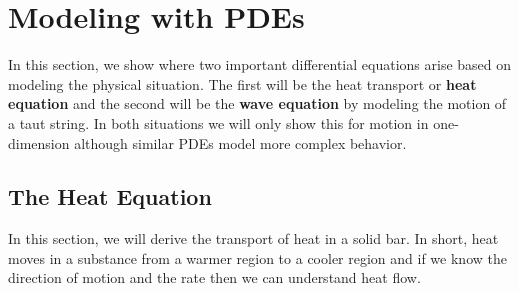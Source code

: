 %

\section{Modeling with PDEs} \label{sect:modeling:pdes}

In this section, we show where two important differential equations arise based on modeling the physical situation.  The first will be the heat transport or \textbf{heat equation} and the second will be the \textbf{wave equation} by modeling the motion of a taut string.  In both situations we will only show this for motion in one-dimension although similar PDEs model more complex behavior.  

\subsection{The Heat Equation}

In this section, we will derive the transport of heat in a solid bar.   In short, heat moves in a substance from a warmer region to a cooler region and if we know the direction of motion and the rate then we can understand heat flow.  

